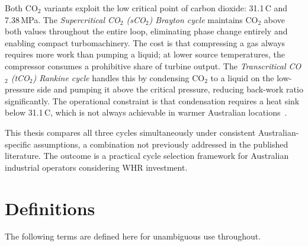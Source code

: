 Both CO$_2$ variants exploit the low critical point of carbon dioxide:
31.1\,\textdegree C and 7.38\,MPa. The \textit{Supercritical CO$_2$ (sCO$_2$)
Brayton cycle} maintains CO$_2$ above both values throughout the entire loop,
eliminating phase change entirely and enabling compact turbomachinery. The
cost is that compressing a gas always requires more work than pumping a
liquid; at lower source temperatures, the compressor consumes a prohibitive
share of turbine output. The \textit{Transcritical CO$_2$ (tCO$_2$) Rankine
cycle} handles this by condensing CO$_2$ to a liquid on the low-pressure side
and pumping it above the critical pressure, reducing back-work ratio
significantly. The operational constraint is that condensation requires a heat sink below 31.1\,\textdegree C, which is not always achievable in warmer Australian locations~\cite{Jiang2023,Lee2023}.

This thesis compares all three cycles simultaneously under consistent
Australian-specific assumptions, a combination not previously addressed in the
published literature. The outcome is a practical cycle selection framework for
Australian industrial operators considering WHR investment.

\section{Definitions}
\label{sec:definitions}

The following terms are defined here for unambiguous use throughout.

